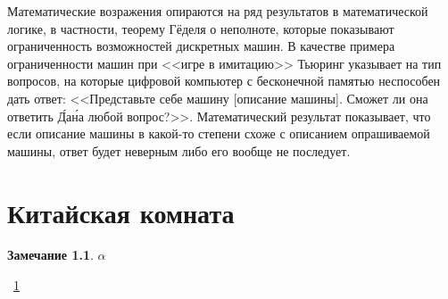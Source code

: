 \documentclass[12pt, specialist, subf, substylefile = spbu.rtx]{disser}
\newtheorem{remark}{Замечание}
\begin{document}
Математические возражения опираются на ряд результатов в математической логике, в частности, теорему Гёделя о неполноте, которые показывают ограниченность возможностей дискретных машин. В качестве примера ограниченности машин при <<игре в имитацию>> Тьюринг указывает на тип вопросов, на которые цифровой компьютер с бесконечной памятью неспособен дать ответ: <<Представьте себе машину [описание машины]. Сможет ли она ответить \'Да\' на любой вопрос?>>. Математический результат показывает, что если описание машины в какой-то степени схоже с описанием опрашиваемой машины, ответ будет неверным либо его вообще не последует.






\chapter{Китайская комната}
\label{sec:chinese}

\begin{remark}
	$\alpha$
\end{remark}

~\ref{sec:chinese} 

\conclusion



\end{document}
